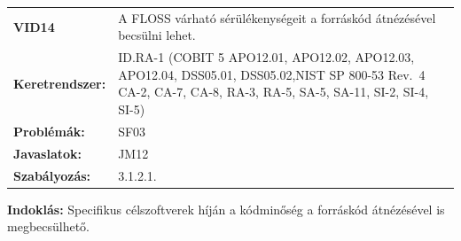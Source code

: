 \documentclass[12pt,magyar,a4paper,oneside]{scrreprt}
\begin{document}
\begin{longtable}[]{@{}ll@{}}
\toprule
\endhead
\begin{minipage}[t]{0.16\columnwidth}\raggedright
\textbf{VID14}\strut
\end{minipage} & \begin{minipage}[t]{0.79\columnwidth}\raggedright
A FLOSS várható sérülékenységeit a forráskód átnézésével becsülni
lehet.\strut
\end{minipage}\tabularnewline
\begin{minipage}[t]{0.16\columnwidth}\raggedright
\textbf{Keretrendszer:}\strut
\end{minipage} & \begin{minipage}[t]{0.79\columnwidth}\raggedright
ID.RA-1 (COBIT 5 APO12.01, APO12.02, APO12.03, APO12.04, DSS05.01,
DSS05.02,NIST SP 800-53 Rev.~4 CA-2, CA-7, CA-8, RA-3, RA-5, SA-5,
SA-11, SI-2, SI-4, SI-5)\strut
\end{minipage}\tabularnewline
\begin{minipage}[t]{0.16\columnwidth}\raggedright
\textbf{Problémák:}\strut
\end{minipage} & \begin{minipage}[t]{0.79\columnwidth}\raggedright
SF03\strut
\end{minipage}\tabularnewline
\begin{minipage}[t]{0.16\columnwidth}\raggedright
\textbf{Javaslatok:}\strut
\end{minipage} & \begin{minipage}[t]{0.79\columnwidth}\raggedright
JM12\strut
\end{minipage}\tabularnewline
\begin{minipage}[t]{0.16\columnwidth}\raggedright
\textbf{Szabályozás:}\strut
\end{minipage} & \begin{minipage}[t]{0.79\columnwidth}\raggedright
3.1.2.1.\strut
\end{minipage}\tabularnewline
\bottomrule
\end{longtable}

\textbf{Indoklás: } Specifikus célszoftverek híján a kódminőség a
forráskód átnézésével is megbecsülhető.
\end{document}

